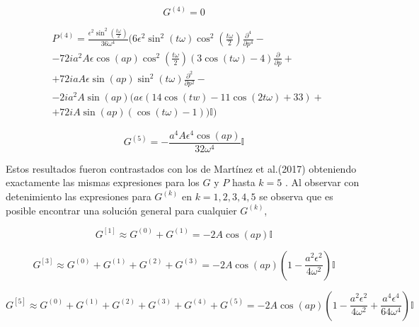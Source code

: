 \begin{equation}
  G^{(4)}=0  
\end{equation}

\begin{equation}\label{eq:10.17}
\begin{aligned}
        &P^{(4)}=\frac{\epsilon^2 \sin ^2\left(\frac{t \omega}{2}\right)}{36 \omega^4} (6 \epsilon^2  \sin ^2(t\omega) \cos^2 \left(\frac{t \omega}{2}\right)\frac{\partial^4}{\partial p^4}-\\&-72 i a^2 A \epsilon  \cos (a p) \cos
   ^2\left(\frac{t \omega}{2}\right) (3 \cos (t \omega)-4)\frac{\partial}{\partial p}+\\&+72 i a A \epsilon \sin (a p) \sin ^2(t \omega)\frac{\partial^2}{\partial p^2}-\\&-2 i a^2 A \sin (a p) (a \epsilon (14 \cos (t w)-11 \cos (2 t \omega)+33)+\\&+72 i A \sin (a p) (\cos
   (t \omega)-1))\mathbb{I})
    \end{aligned}
\end{equation}

\begin{equation}\label{eq:10.18}
    G^{(5)}=-\frac{a^4 A \epsilon^4\cos(a p)}{32 \omega^4}\mathbb{I}
\end{equation}


 Estos resultados fueron contrastados con los de Martínez et al.(2017) obteniendo exactamente las mismas expresiones para los $G$ y $P$ hasta $k=5$ \cite{martinez2017}. Al observar con detenimiento las expresiones para $G^{(k)}$ en $k=1,2,3,4,5$ se observa que es posible encontrar una solución general para cualquier  $G^{(k)}$,

\begin{equation}\label{eq:10.19}
    G^{[1]} \approx G^{(0)}+G^{(1)}=-2A\cos (a p)\mathbb{I}
\end{equation}

\begin{equation}\label{eq:10.20}
    G^{[3]} \approx G^{(0)}+G^{(1)}+G^{(2)}+G^{(3)}=-2A\cos (a p)\left(1-\frac{a^2 \epsilon^2  }{4 \omega^2}\right)\mathbb{I}
\end{equation}

\begin{equation}\label{eq:10.21}
    G^{[5]} \approx G^{(0)}+G^{(1)}+G^{(2)}+G^{(3)}+G^{(4)}+G^{(5)}=-2A\cos (a p)\left(1-\frac{a^2 \epsilon^2  }{4 \omega^2}+\frac{a^4 \epsilon^4}{64 \omega^4}\right)\mathbb{I}
\end{equation}

